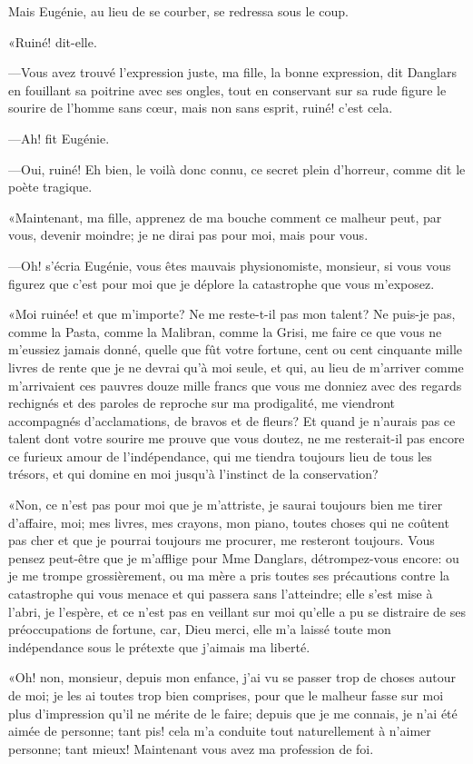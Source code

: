 Mais Eugénie, au lieu de se courber, se redressa sous le coup. 

«Ruiné! dit-elle. 

—Vous avez trouvé l'expression juste, ma fille, la bonne expression, dit Danglars en fouillant sa poitrine avec ses ongles, tout en conservant sur sa rude figure le sourire de l'homme sans cœur, mais non sans esprit, ruiné! c'est cela. 

—Ah! fit Eugénie. 

—Oui, ruiné! Eh bien, le voilà donc connu, ce secret plein d'horreur, comme dit le poète tragique. 

«Maintenant, ma fille, apprenez de ma bouche comment ce malheur peut, par vous, devenir moindre; je ne dirai pas pour moi, mais pour vous. 

—Oh! s'écria Eugénie, vous êtes mauvais physionomiste, monsieur, si vous vous figurez que c'est pour moi que je déplore la catastrophe que vous m'exposez. 

«Moi ruinée! et que m'importe? Ne me reste-t-il pas mon talent? Ne puis-je pas, comme la Pasta, comme la Malibran, comme la Grisi, me faire ce que vous ne m'eussiez jamais donné, quelle que fût votre fortune, cent ou cent cinquante mille livres de rente que je ne devrai qu'à moi seule, et qui, au lieu de m'arriver comme m'arrivaient ces pauvres douze mille francs que vous me donniez avec des regards rechignés et des paroles de reproche sur ma prodigalité, me viendront accompagnés d'acclamations, de bravos et de fleurs? Et quand je n'aurais pas ce talent dont votre sourire me prouve que vous doutez, ne me resterait-il pas encore ce furieux amour de l'indépendance, qui me tiendra toujours lieu de tous les trésors, et qui domine en moi jusqu'à l'instinct de la conservation? 

«Non, ce n'est pas pour moi que je m'attriste, je saurai toujours bien me tirer d'affaire, moi; mes livres, mes crayons, mon piano, toutes choses qui ne coûtent pas cher et que je pourrai toujours me procurer, me resteront toujours. Vous pensez peut-être que je m'afflige pour Mme Danglars, détrompez-vous encore: ou je me trompe grossièrement, ou ma mère a pris toutes ses précautions contre la catastrophe qui vous menace et qui passera sans l'atteindre; elle s'est mise à l'abri, je l'espère, et ce n'est pas en veillant sur moi qu'elle a pu se distraire de ses préoccupations de fortune, car, Dieu merci, elle m'a laissé toute mon indépendance sous le prétexte que j'aimais ma liberté. 

«Oh! non, monsieur, depuis mon enfance, j'ai vu se passer trop de choses autour de moi; je les ai toutes trop bien comprises, pour que le malheur fasse sur moi plus d'impression qu'il ne mérite de le faire; depuis que je me connais, je n'ai été aimée de personne; tant pis! cela m'a conduite tout naturellement à n'aimer personne; tant mieux! Maintenant vous avez ma profession de foi. 

